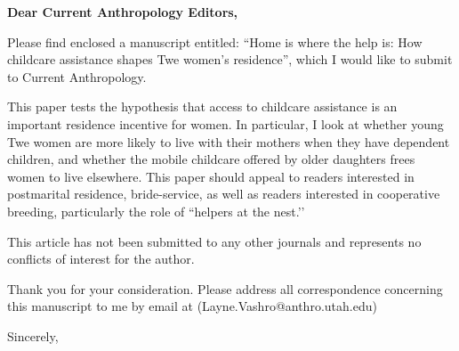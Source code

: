\documentclass{letter}
\begin{document}

\begin{letter}{} %


\opening{\textbf{Dear Current Anthropology Editors,}}
 
Please find enclosed a manuscript entitled: ``Home is where the help is: How childcare assistance shapes Twe women's residence'', which I would like to submit to Current Anthropology.
 
This paper tests the hypothesis that access to childcare assistance is an important residence incentive for women. In particular, I look at whether young Twe women are more likely to live with their mothers when they have dependent children, and whether the mobile childcare offered by older daughters frees women to live elsewhere.  This paper should appeal to readers interested in postmarital residence, bride-service, as well as readers interested in cooperative breeding, particularly the role of ``helpers at the nest.’’
 
This article has not been submitted to any other journals and represents no conflicts of interest for the author.

Thank you for your consideration.  Please address all correspondence concerning this manuscript to me by email at (Layne.Vashro@anthro.utah.edu)


\vspace{2\parskip} %
\closing{Sincerely,\\
 \\
}




\end{letter}
 
\end{document}
